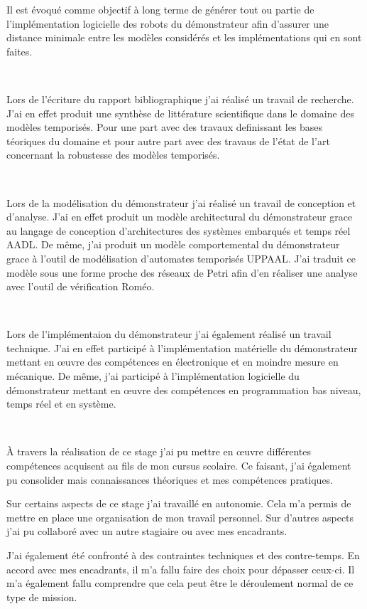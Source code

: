     Il est évoqué comme objectif à long terme de générer tout ou partie de
    l'implémentation logicielle des robots du démonstrateur afin d'assurer une
    distance minimale entre les modèles considérés et les implémentations qui
    en sont faites. 
    
    ~

    Lors de l'écriture du rapport bibliographique j'ai réalisé un travail de
    recherche. J'ai en effet produit une synthèse de littérature scientifique
    dans le domaine des modèles temporisés. Pour une part avec des travaux
    definissant les bases téoriques du domaine et pour autre part avec des
    travaus de l'état de l'art concernant la robustesse des modèles temporisés.

    ~

    Lors de la modélisation du démonstrateur j'ai réalisé un travail de
    conception et d'analyse. J'ai en effet produit un modèle architectural du
    démonstrateur grace au langage de conception d'architectures des systèmes
    embarqués et temps réel AADL. De même, j'ai produit un modèle comportemental du
    démonstrateur grace à l'outil de modélisation d'automates temporisés
    UPPAAL. J'ai traduit ce modèle sous une forme proche des réseaux de Petri
    afin d'en réaliser une analyse avec l'outil de vérification Roméo.

    ~

    Lors de l'implémentaion du démonstrateur j'ai également réalisé un travail
    technique. J'ai en effet participé à l'implémentation
    matérielle du démonstrateur mettant en \oe uvre des compétences en
    électronique et en moindre mesure en mécanique. De même, j'ai participé à
    l'implémentation logicielle du démonstrateur mettant en \oe uvre des
    compétences en programmation bas niveau, temps réel et en système.

    ~

    À travers la réalisation de ce stage j'ai pu mettre en \oe uvre différentes
    compétences acquisent au fils de mon cursus scolaire. Ce faisant, j'ai
    également pu consolider mais connaissances théoriques et mes compétences
    pratiques.

    Sur certains aspects de ce stage j'ai travaillé en autonomie. Cela m'a
    permis de mettre en place une organisation de mon travail personnel. Sur
    d'autres aspects j'ai pu collaboré avec un autre stagiaire ou avec mes
    encadrants.

    J'ai également été confronté à des contraintes techniques et des
    contre-temps. En accord avec mes encadrants, il m'a fallu faire des choix
    pour dépasser ceux-ci. Il m'a également fallu comprendre que cela peut être
    le déroulement normal de ce type de mission.

